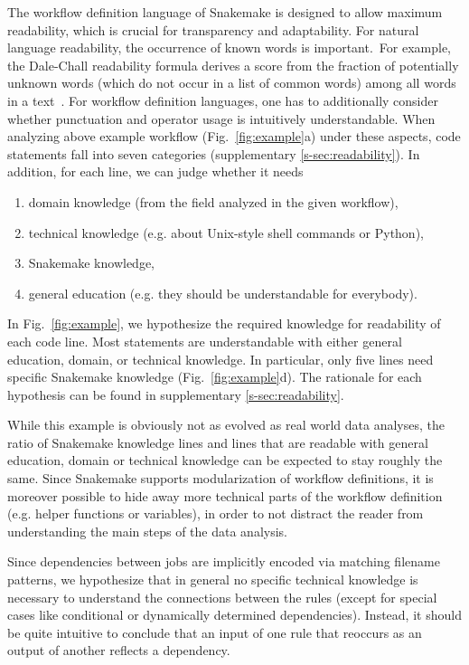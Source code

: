 \documentclass[parskip=half]{scrartcl}
\begin{document}
The workflow definition language of Snakemake is designed to allow maximum readability, which is crucial for transparency and adaptability.
For natural language readability, the occurrence of known words is important.~For example, the Dale-Chall readability formula derives a score from the fraction of potentially unknown words (which do not occur in a list of common words) among all words in a text~\parencite{chall_readability_1995}.
For workflow definition languages, one has to additionally consider whether punctuation and operator usage is intuitively understandable.
When analyzing above example workflow (Fig.~\ref{fig:example}a) under these aspects, code statements fall into seven categories (supplementary \autoref{s-sec:readability}).
In addition, for each line, we can judge whether it needs

\begin{enumerate}
	\item domain knowledge (from the field analyzed in the given workflow),
	\item technical knowledge (e.g. about Unix-style shell commands or Python),
	\item Snakemake knowledge,
	\item general education (e.g. they should be understandable for everybody).
\end{enumerate}

In Fig.~{\ref{fig:example}}, we hypothesize the required knowledge for readability of each code line.
Most statements are understandable with either general education, domain, or technical knowledge.
In particular, only five lines need specific Snakemake knowledge (Fig.~{\ref{fig:example}}d).
The rationale for each hypothesis can be found in supplementary \autoref{s-sec:readability}.

While this example is obviously not as evolved as real world data analyses, the ratio of Snakemake knowledge lines and lines that are readable with general education, domain or technical knowledge can be expected to stay roughly the same.
Since Snakemake supports modularization of workflow definitions, it is moreover possible to hide away more technical parts of the workflow definition (e.g. helper functions or variables), in order to not distract the reader from understanding the main steps of the data analysis.

Since dependencies between jobs are implicitly encoded via matching filename patterns, we hypothesize that in general no specific technical knowledge is necessary to understand the connections between the rules (except for special cases like conditional or dynamically determined dependencies).
Instead, it should be quite intuitive to conclude that an input of one rule that reoccurs as an output of another reflects a dependency.
\end{document}
